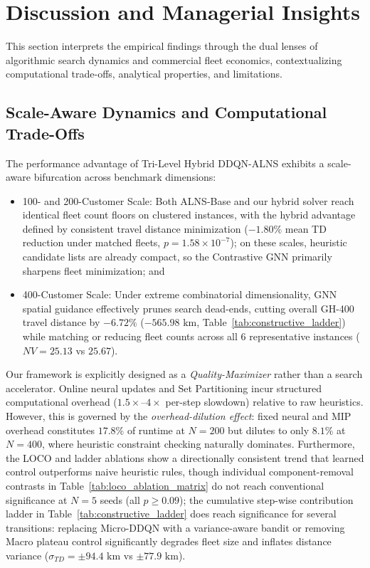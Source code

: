 \documentclass{ieeeaccess}
\begin{document}
\section{Discussion and Managerial Insights}
\label{sec:discussion}

This section interprets the empirical findings through the dual lenses of algorithmic search dynamics and commercial fleet economics, contextualizing computational trade-offs, analytical properties, and limitations.

\subsection{Scale-Aware Dynamics and Computational Trade-Offs}
\label{sec:disc_scale_aware}

The performance advantage of Tri-Level Hybrid DDQN-ALNS exhibits a scale-aware bifurcation across benchmark dimensions: 
\begin{itemize}
    \item[(i)] 100- and 200-Customer Scale: Both ALNS-Base and our hybrid solver reach identical fleet count floors on clustered instances, with the hybrid advantage defined by consistent travel distance minimization ($-1.80\%$ mean TD reduction under matched fleets, $p=1.58 \times 10^{-7}$); on these scales, heuristic candidate lists are already compact, so the Contrastive GNN primarily sharpens fleet minimization; and
    \item[(ii)] 400-Customer Scale: Under extreme combinatorial dimensionality, GNN spatial guidance effectively prunes search dead-ends, cutting overall GH-400 travel distance by $-6.72\%$ ($-565.98\text{ km}$, Table~\ref{tab:constructive_ladder}) while matching or reducing fleet counts across all 6 representative instances ($NV=25.13$ vs $25.67$).
\end{itemize} 

Our framework is explicitly designed as a \emph{Quality-Maximizer} rather than a search accelerator. Online neural updates and Set Partitioning incur structured computational overhead ($1.5\times\text{--}4\times$ per-step slowdown) relative to raw heuristics. However, this is governed by the \textit{overhead-dilution effect}: fixed neural and MIP overhead constitutes $17.8\%$ of runtime at $N=200$ but dilutes to only $8.1\%$ at $N=400$, where heuristic constraint checking naturally dominates. Furthermore, the LOCO and ladder ablations show a directionally consistent trend that learned control outperforms naive heuristic rules, though individual component-removal contrasts in Table~\ref{tab:loco_ablation_matrix} do not reach conventional significance at $N=5$ seeds (all $p \ge 0.09$); the cumulative step-wise contribution ladder in Table~\ref{tab:constructive_ladder} does reach significance for several transitions: replacing Micro-DDQN with a variance-aware bandit or removing Macro plateau control significantly degrades fleet size and inflates distance variance ($\sigma_{TD} = \pm 94.4\text{ km}$ vs $\pm 77.9\text{ km}$).
\end{document}
